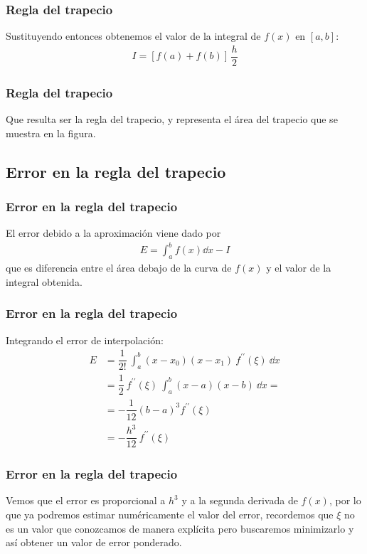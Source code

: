 \begin{frame}
\frametitle{Regla del trapecio}
Sustituyendo entonces obtenemos el valor de la integral de $f(x)$ en $[a, b]$:
\begin{align*}
I = \left[ f(a) + f(b) \right] \, \dfrac{h}{2}
\end{align*}
\end{frame}
\begin{frame}
\frametitle{Regla del trapecio}
\begin{figure}
	\centering
	
\end{figure}
Que resulta ser la regla del trapecio, y representa el área del trapecio que se muestra en la figura.
\end{frame}
\subsection{Error en la regla del trapecio}
\begin{frame}
\frametitle{Error en la regla del trapecio}
El error debido a la aproximación viene dado por
\begin{align*}
E = \int_{a}^{b} f(x) \dd{x} - I
\end{align*}
que es diferencia entre el área debajo de la curva de $f(x)$ y el valor de la integral obtenida. 
\end{frame}
\begin{frame}
\frametitle{Error en la regla del trapecio}
Integrando el error de interpolación:
\begin{align*}
E &= \dfrac{1}{2!} \: \int_{a}^{b} (x - x_{0})(x - x_{1}) \: f^{\prime \prime}(\xi) \: \dd{x}  \\
&= \dfrac{1}{2} \: f^{\prime \prime}(\xi) \: \int_{a}^{b} (x - a)(x - b) \: \dd{x} = \\
&= -\dfrac{1}{12}(b - a)^{3} f^{\prime \prime} (\xi) \\
&= -\dfrac{h^{3}}{12} \: f^{\prime \prime}(\xi)
\end{align*}
\end{frame}
\begin{frame}
\frametitle{Error en la regla del trapecio}
Vemos que el error es proporcional a $h^{3}$ y a la segunda derivada de $f(x)$, por lo que ya podremos estimar numéricamente el valor del error, recordemos que $\xi$ no es un valor que conozcamos de manera explícita pero buscaremos minimizarlo y así obtener un valor de error ponderado.
\end{frame}
